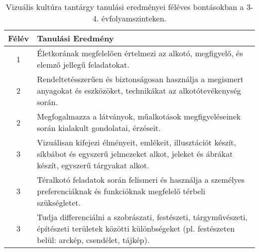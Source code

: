        
           \begin{longtable}{c | p{} }
            \caption[Vizuális kultúra 3-4.]{Vizuális kultúra tantárgy tanulási eredményei féléves bontásokban a 3-4. évfolyamszinteken. }  \\

            \textbf{Félév} & \textbf{Tanulási Eredmény} \\
            \hline
            \endhead
                                
                                          1 &  Életkorának megfelelően értelmezi az alkotó, megfigyelő, és elemző jellegű feladatokat. \\ \hline
                                      
                                
                                          2 &  Rendeltetésszerűen és biztonságosan használja a megismert anyagokat és eszközöket, technikákat az alkotótevékenység során. \\ \hline
                                          2 &  Megfogalmazza a látványok, műalkotások megfigyeléseinek során kialakult gondolatai, érzéseit. \\ \hline
                                      
                                
                                          3 &  Vizuálisan kifejezi élményeit, emlékeit, illusztációt készít, síkbábot és egyszerű jelmezeket alkot, jeleket és ábrákat készít, egyszerű tárgyakat alkot. \\ \hline
                                          3 &  Téralkotó feladatok során felismeri és használja a személyes preferenciáknak és funkcióknak megfelelő térbeli szükségletet. \\ \hline
                                          3 &  Tudja  differenciálni a szobrászati, festészeti, tárgyművészeti, építészeti területek közötti különbségeket (pl. festészeten belül: arckép, csendélet, tájkép). \\ \hline
                                      

\end{longtable}
